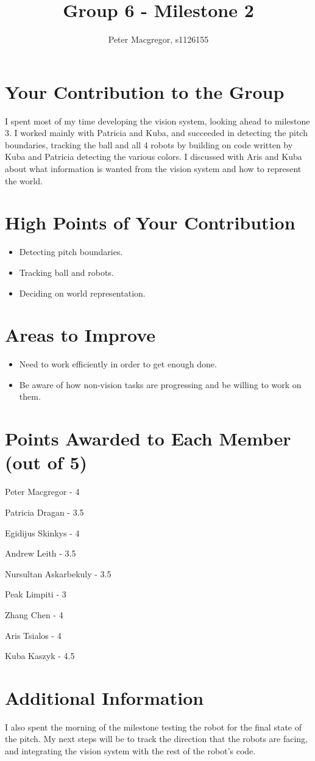 \documentclass[dvips]{article}
\begin{document}
\sloppy
\title{Group 6 - Milestone 2}
 
\author{Peter Macgregor, s1126155}
 
\maketitle

\section{Your Contribution to the Group}
I spent most of my time developing the vision system, looking ahead to milestone 3.
I worked mainly with Patricia and Kuba, and succeeded in detecting the pitch boundaries,
tracking the ball and all 4 robots by building on code written by Kuba and Patricia detecting the various colors.
I discussed with Aris and Kuba about what information is wanted from the vision system and how to represent the world.

\section{High Points of Your Contribution}
\begin{itemize}
  \item Detecting pitch boundaries.
  \item Tracking ball and robots.
  \item Deciding on world representation.
\end{itemize} 

\section{Areas to Improve}
\begin{itemize}
  \item Need to work efficiently in order to get enough done.
  \item Be aware of how non-vision tasks are progressing and be willing to work on them.
\end{itemize}


\section{Points Awarded to Each Member (out of 5)}
\begin{itemize}
\begin{multicols}{2}
\item Peter Macgregor - 4
\item Patricia Dragan - 3.5
\item Egidijus Skinkys - 4
\item Andrew Leith - 3.5
\item Nursultan Askarbekuly - 3.5
\item Peak Limpiti - 3
\item Zhang Chen - 4
\item Aris Tsialos - 4
\item Kuba Kaszyk - 4.5
\end{multicols}
\end{itemize}

\section{Additional Information}
I also spent the morning of the milestone testing the robot for the final state of the pitch.
My next steps will be to track the direction that the robots are facing,
and integrating the vision system with the rest of the robot's code.
\end{document}
